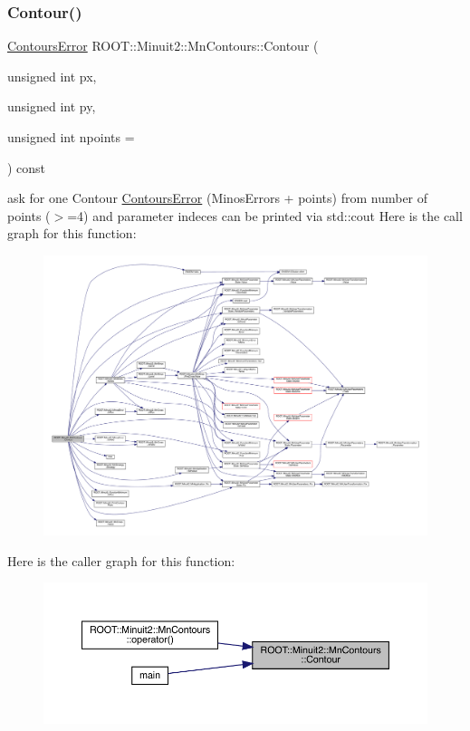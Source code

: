 \subsubsection{\texorpdfstring{Contour()}{Contour()}\hspace{0.1cm}{\footnotesize\ttfamily [1/3]}}
{\footnotesize\ttfamily \mbox{\hyperlink{classROOT_1_1Minuit2_1_1ContoursError}{Contours\+Error}} R\+O\+O\+T\+::\+Minuit2\+::\+Mn\+Contours\+::\+Contour (\begin{DoxyParamCaption}\item[{unsigned int}]{px,  }\item[{unsigned int}]{py,  }\item[{unsigned int}]{npoints = {} }\end{DoxyParamCaption}) const}

ask for one Contour \mbox{\hyperlink{classROOT_1_1Minuit2_1_1ContoursError}{Contours\+Error}} (Minos\+Errors + points) from number of points ($>$=4) and parameter indeces can be printed via std\+::cout Here is the call graph for this function\+:
\nopagebreak
\begin{figure}[H]
\begin{center}
\leavevmode
\includegraphics[width=350pt]{d9/de7/classROOT_1_1Minuit2_1_1MnContours_a8bcd5be6a72acc39c1b56fd45e9958ba_cgraph}
\end{center}
\end{figure}
Here is the caller graph for this function\+:
\nopagebreak
\begin{figure}[H]
\begin{center}
\leavevmode
\includegraphics[width=350pt]{d9/de7/classROOT_1_1Minuit2_1_1MnContours_a8bcd5be6a72acc39c1b56fd45e9958ba_icgraph}
\end{center}
\end{figure}
